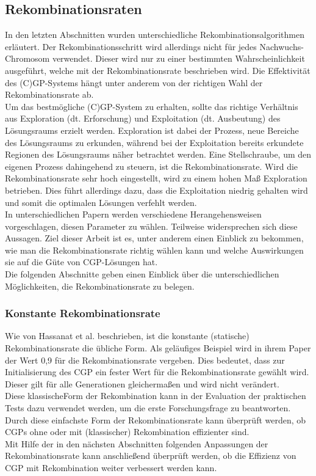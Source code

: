 \subsection{Rekombinationsraten}

In den letzten Abschnitten wurden unterschiedliche Rekombinationsalgorithmen erläutert.
Der Rekombinationsschritt wird allerdings nicht für jedes Nachwuchs-Chromosom verwendet.
Dieser wird nur zu einer bestimmten Wahrscheinlichkeit ausgeführt, welche mit der Rekombinationsrate beschrieben wird.
Die Effektivität des (C)GP-Systems hängt unter anderem von der richtigen Wahl der Rekombinationsrate ab. \cite{hassanat_choosing_2019}\\
Um das bestmögliche (C)GP-System zu erhalten, sollte das richtige Verhältnis aus Exploration (dt. Erforschung) und Exploitation (dt. Ausbeutung) des Lösungsraums erzielt werden. 
Exploration ist dabei der Prozess, neue Bereiche des Lösungsraums zu erkunden, während bei der Exploitation bereits erkundete Regionen des Lösungsraums näher betrachtet werden.
Eine Stellschraube, um den eigenen Prozess dahingehend zu steuern, ist die Rekombinationsrate. \cite{crepinsek_exploration_2013}
Wird die Rekombinationsrate sehr hoch eingestellt, wird zu einem hohen Maß Exploration betrieben. 
Dies führt allerdings dazu, dass die Exploitation niedrig gehalten wird und somit die optimalen Lösungen verfehlt werden. \cite{pavai_survey_2017}\\
In unterschiedlichen Papern werden verschiedene Herangehensweisen vorgeschlagen, diesen Parameter zu wählen.
Teilweise widersprechen sich diese Aussagen.
Ziel dieser Arbeit ist es, unter anderem einen Einblick zu bekommen, wie man die Rekombinationsrate richtig wählen kann und welche Auswirkungen sie auf die Güte von CGP-Lösungen hat.\\

Die folgenden Abschnitte geben einen Einblick über die unterschiedlichen Möglichkeiten, die Rekombinationsrate zu belegen.

\subsubsection{Konstante Rekombinationsrate}
\label{subsubsec:konstanteCrossover}

Wie von Hassanat et al. beschrieben, ist die konstante (statische) Rekombinationsrate die übliche Form. 
Als geläufiges Beispiel wird in ihrem Paper der Wert 0,9 für die Rekombinationsrate vergeben. \cite{hassanat_choosing_2019} 
Dies bedeutet, dass zur Initialisierung des CGP ein fester Wert für die Rekombinationsrate gewählt wird.
Dieser gilt für alle Generationen gleichermaßen und wird nicht verändert.\\
Diese \glqq klassische\grqq\space Form der Rekombination kann in der Evaluation der praktischen Tests dazu verwendet werden, um die erste Forschungsfrage zu beantworten.
Durch diese einfachste Form der Rekombinationsrate kann überprüft werden, ob CGPs ohne oder mit (klassischer) Rekombination effizienter sind.\\
Mit Hilfe der in den nächsten Abschnitten folgenden Anpassungen der Rekombinationsrate kann anschließend überprüft werden, ob die Effizienz von CGP mit Rekombination weiter verbessert werden kann.

